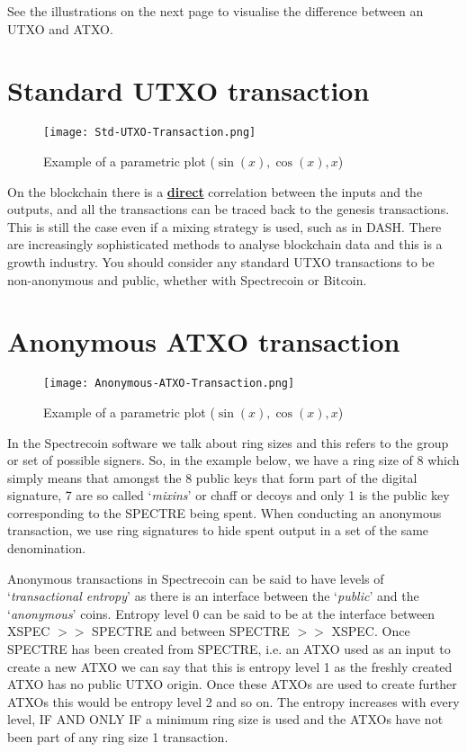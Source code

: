See the illustrations on the next page to visualise the difference between an
UTXO and ATXO.



\section{Standard UTXO transaction}

\begin{figure}[h]
	\caption{Example of a parametric plot ($\sin (x), \cos(x), x$)}
	\centering
	\texttt{[image: Std-UTXO-Transaction.png]}
\end{figure}

On the blockchain there is a \textbf{\underline{direct}} correlation 
between the inputs and the
outputs, and all the transactions can be traced back to the genesis
transactions. This is still the case even if a mixing strategy is used,
such as in DASH. There are increasingly sophisticated methods to analyse
blockchain data and this is a growth industry. You should consider any
standard UTXO transactions to be non-anonymous and public, whether with
Spectrecoin or Bitcoin.



\section{Anonymous ATXO transaction}



\begin{figure}[h]
	\caption{Example of a parametric plot ($\sin (x), \cos(x), x$)}
	\centering
	\texttt{[image: Anonymous-ATXO-Transaction.png]}
\end{figure}



In the Spectrecoin software we talk about ring sizes and this refers to the
group or set of possible signers. So, in the example below, we have a ring
size of 8 which simply means that amongst the 8 public keys that form part
of the digital signature, 7 are so called ‘\textit{mixins}’ or chaff or decoys and
only 1 is the public key corresponding to the SPECTRE being spent. When
conducting an anonymous transaction, we use ring signatures to hide spent
output in a set of the same denomination.



Anonymous transactions in Spectrecoin can be said to have levels of
‘\textit{transactional entropy}’ as there is an interface between the ‘\textit{public}’
and the ‘\textit{anonymous}’ coins. Entropy level 0 can be said to be at the
interface between XSPEC $>>$ SPECTRE and between SPECTRE $>>$ XSPEC. Once
SPECTRE has been created from SPECTRE, i.e. an ATXO used as an input to
create a new ATXO we can say that this is entropy level 1 as the freshly
created ATXO has no public UTXO origin. Once these ATXOs are used to
create further ATXOs this would be entropy level 2 and so on. The entropy
increases with every level, IF AND ONLY IF a minimum ring size is used and
the ATXOs have not been part of any ring size 1 transaction.




